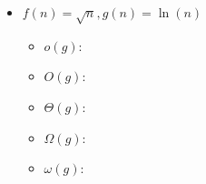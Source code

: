 \documentclass[11pt]{article}
\begin{document}
        \begin{itemize}
            \item $f\left( n \right) = \sqrt{n}, g\left( n \right) = \ln(n)$
                \begin{itemize}
                    \item $o\left( g \right) $: 
                    \item $O\left( g \right) $:
                    \item $\Theta \left( g \right) $:
                    \item $\Omega\left( g \right) $:
                    \item $\omega\left( g \right) $: 
                \end{itemize}
        \end{itemize}
        




        
\end{document}
